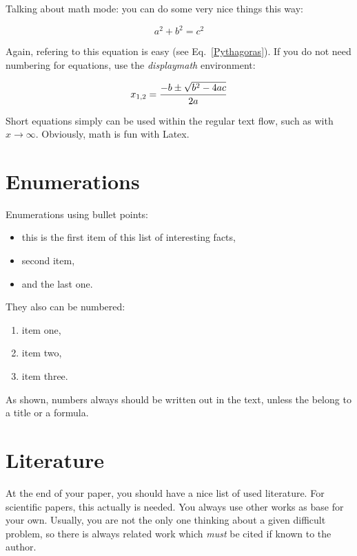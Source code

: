 \documentclass[A4,10pt]{article}
\begin{document}
Talking about math mode: you can do some very nice things this way:

\begin{equation}
a^2 + b^2 = c^2
\label{Pythagoras}
\end{equation}

Again, refering to this equation is easy (see Eq.~\ref{Pythagoras}).
If you do not need numbering for equations, use the {\em displaymath}
environment:

\begin{displaymath}
x_{1,2} = \frac{-b \pm \sqrt{b^2-4ac}}{2a}\\
\end{displaymath}

Short equations simply can be used within the regular text flow, such
as with $x \to \infty$. Obviously, math is fun with Latex.


\section{Enumerations}

Enumerations using bullet points:

\begin{itemize}
	\item this is the first item of this list of interesting facts,
	\item second item,
	\item and the last one.
\end{itemize}

They also can be numbered:

\begin{enumerate}
	\item item one,
	\item item two,
	\item item three.
\end{enumerate}

As shown, numbers always should be written out in the text, unless the
belong to a title or a formula.

\section{Literature}

At the end of your paper, you should have a nice list of used
literature. For scientific papers, this actually is needed. You always
use other works as base for your own. Usually, you are not the only
one thinking about a given difficult problem, so there is always
related work which {\em must} be cited if known to the author.
\end{document}
